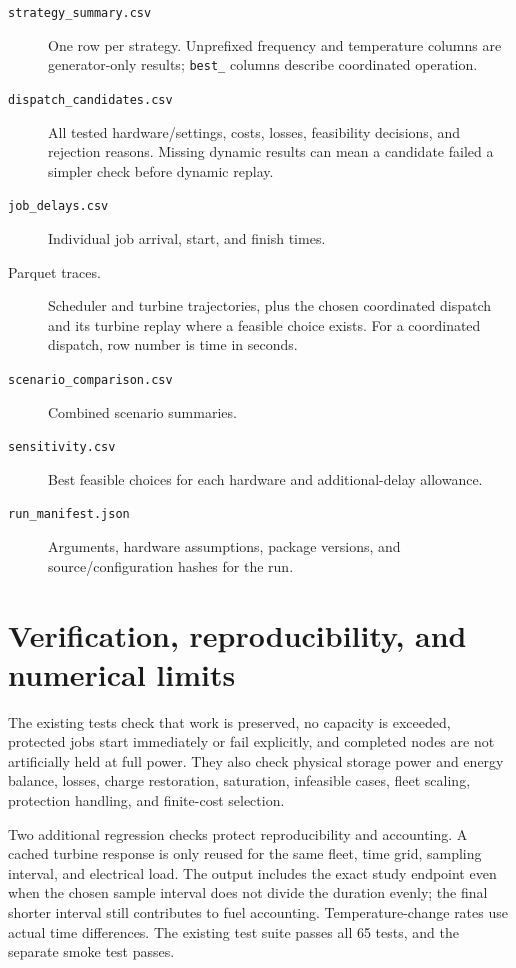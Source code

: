 \documentclass[11pt]{article}
\begin{document}
\begin{description}
\item[\texttt{strategy\_summary.csv}] One row per strategy.
Unprefixed frequency and temperature columns are generator-only results;
\texttt{best\_} columns describe coordinated operation.
\item[\texttt{dispatch\_candidates.csv}] All tested hardware/settings, costs,
losses, feasibility decisions, and rejection reasons. Missing dynamic
results can mean a candidate failed a simpler check before dynamic replay.
\item[\texttt{job\_delays.csv}] Individual job arrival, start, and finish times.
\item[Parquet traces.] Scheduler and turbine trajectories, plus the chosen
coordinated dispatch and its turbine replay where a feasible choice exists.
For a coordinated dispatch, row number is time in seconds.
\item[\texttt{scenario\_comparison.csv}] Combined scenario summaries.
\item[\texttt{sensitivity.csv}] Best feasible choices for each hardware
and additional-delay allowance.
\item[\texttt{run\_manifest.json}] Arguments, hardware assumptions, package
versions, and source/configuration hashes for the run.
\end{description}

\section{Verification, reproducibility, and numerical limits}

The existing tests check that work is preserved, no capacity is exceeded,
protected jobs start immediately or fail explicitly, and completed nodes
are not artificially held at full power. They also check physical storage
power and energy balance, losses, charge restoration, saturation,
infeasible cases, fleet scaling, protection handling, and finite-cost
selection.

Two additional regression checks protect reproducibility and accounting.
A cached turbine response is only reused for the same fleet, time grid,
sampling interval, and electrical load. The output includes the exact
study endpoint even when the chosen sample interval does not divide
the duration evenly; the final shorter interval still contributes to fuel
accounting. Temperature-change rates use actual time differences.
The existing test suite passes all 65 tests, and the separate smoke test passes.
\end{document}
